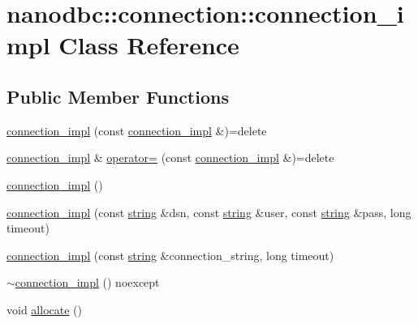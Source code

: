 \hypertarget{classnanodbc_1_1connection_1_1connection__impl}{}\section{nanodbc\+::connection\+::connection\+\_\+impl Class Reference}
\label{classnanodbc_1_1connection_1_1connection__impl}
\subsection*{Public Member Functions}
\begin{DoxyCompactItemize}
\item 
\mbox{\hyperlink{classnanodbc_1_1connection_1_1connection__impl_abf4659ded7b032cca5e6638a66818460}{connection\+\_\+impl}} (const \mbox{\hyperlink{classnanodbc_1_1connection_1_1connection__impl}{connection\+\_\+impl}} \&)=delete
\item 
\mbox{\hyperlink{classnanodbc_1_1connection_1_1connection__impl}{connection\+\_\+impl}} \& \mbox{\hyperlink{classnanodbc_1_1connection_1_1connection__impl_a4b97ea94ea4ce47192f822b779a0d127}{operator=}} (const \mbox{\hyperlink{classnanodbc_1_1connection_1_1connection__impl}{connection\+\_\+impl}} \&)=delete
\item 
\mbox{\hyperlink{classnanodbc_1_1connection_1_1connection__impl_ace7e4891a137dcbf9426ed59f78951c8}{connection\+\_\+impl}} ()
\item 
\mbox{\hyperlink{classnanodbc_1_1connection_1_1connection__impl_ac89ed4ea873886828e7886b932f8f6ca}{connection\+\_\+impl}} (const \mbox{\hyperlink{namespacenanodbc_abfc0ece56278e590911ec8352774c212}{string}} \&dsn, const \mbox{\hyperlink{namespacenanodbc_abfc0ece56278e590911ec8352774c212}{string}} \&user, const \mbox{\hyperlink{namespacenanodbc_abfc0ece56278e590911ec8352774c212}{string}} \&pass, long timeout)
\item 
\mbox{\hyperlink{classnanodbc_1_1connection_1_1connection__impl_aa31978244f856c21d74e182c5ffebc1a}{connection\+\_\+impl}} (const \mbox{\hyperlink{namespacenanodbc_abfc0ece56278e590911ec8352774c212}{string}} \&connection\+\_\+string, long timeout)
\item 
\mbox{\hyperlink{classnanodbc_1_1connection_1_1connection__impl_ada58641ce2e34f56ac1e405025e98565}{$\sim$connection\+\_\+impl}} () noexcept
\item 
void \mbox{\hyperlink{classnanodbc_1_1connection_1_1connection__impl_aa7d28fafbb50c17a176f878b72c3bca5}{allocate}} ()

\end{DoxyCompactItemize}
